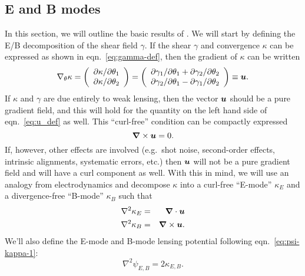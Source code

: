 \subsection{E and B modes}
In this section, we will outline the basic results of \citet{Schneider02b}.
We will start by defining the E/B decomposition of the shear field $\gamma$.
If the shear $\gamma$ and convergence $\kappa$ can be expressed as shown
in eqn.~\ref{eq:gamma-def}, then the gradient of $\kappa$ can be written
\begin{equation}
  \label{eq:u_def}
  \nabla_\theta \kappa =
  \left(
  \begin{array}{l}
    \partial \kappa / \partial\theta_1\\
    \partial \kappa / \partial\theta_2 
  \end{array}
  \right) 
  =
  \left(
  \begin{array}{l}
    \partial \gamma_1 / \partial\theta_1 + \partial\gamma_2/\partial\theta_2\\
    \partial \gamma_2 / \partial\theta_1 - \partial\gamma_1/\partial\theta_2
  \end{array}
  \right)
  \equiv
  \boldsymbol{u}.
\end{equation}
If $\kappa$ and $\gamma$ are due entirely to weak lensing, then the vector
$\boldsymbol{u}$ should be a pure gradient field, and this will hold for the
quantity on the left hand side of eqn.~\ref{eq:u_def} as well.
This ``curl-free'' condition can be compactly expressed
\begin{equation}
  \label{eq:curl-free}
  \boldsymbol{\nabla} \times \boldsymbol{u} = 0.
\end{equation}
If, however, other effects are involved (e.g.~shot noise, second-order effects,
intrinsic alignments, systematic errors, etc.)
then $\boldsymbol{u}$ will not be a pure gradient field and will have a curl
component as well.
With this in mind, we will use an analogy from electrodynamics and decompose
$\kappa$ into a curl-free ``E-mode'' $\kappa_E$ and a divergence-free
``B-mode'' $\kappa_B$ such that
\begin{eqnarray}
  \nabla^2 \kappa_E &=& \boldsymbol{\nabla} \cdot \boldsymbol{u}\\
  \nabla^2 \kappa_B &=& \boldsymbol{\nabla} \times \boldsymbol{u}.
\end{eqnarray}
We'll also define the E-mode and B-mode lensing potential following
eqn.~\ref{eq:psi-kappa-1}:
\begin{equation}
  \nabla^2 \psi_{E, B} = 2\kappa_{E, B}.
\end{equation}
